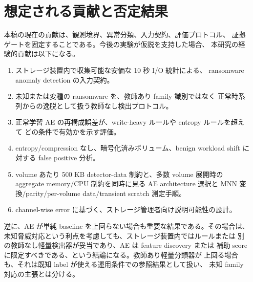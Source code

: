 \section{想定される貢献と否定結果}

本稿の現在の貢献は、観測境界、異常分類、入力契約、評価プロトコル、
証拠ゲートを固定することである。今後の実験が仮説を支持した場合、
本研究の経験的貢献は以下になる。

\begin{enumerate}
  \item ストレージ装置内で収集可能な安価な 10 秒 I/O 統計による、
        ransomware anomaly detection の入力契約。
  \item 未知または変種の ransomware を、教師あり family 識別ではなく
        正常時系列からの逸脱として扱う教師なし検出プロトコル。
  \item 正常学習 AE の再構成誤差が、write-heavy ルールや entropy ルールを超えて
        どの条件で有効かを示す評価。
  \item entropy/compression なし、暗号化済みボリューム、benign workload shift に対する
        false positive 分析。
  \item volume あたり 500 KB detector-data 制約と、多数 volume 展開時の
        aggregate memory/CPU 制約を同時に見る AE architecture 選択と
        MNN 変換/parity/per-volume data/transient scratch 測定手順。
  \item channel-wise error に基づく、ストレージ管理者向け説明可能性の設計。
\end{enumerate}

逆に、AE が単純 baseline を上回らない場合も重要な結果である。その場合は、
未知脅威対応という利点を考慮しても、ストレージ装置内ではルールまたは
別の教師なし軽量検出器が妥当であり、AE は feature discovery または
補助 score に限定すべきである、という結論になる。教師あり軽量分類器が
上回る場合も、それは既知 label が使える運用条件での参照結果として扱い、
未知 family 対応の主張とは分ける。

